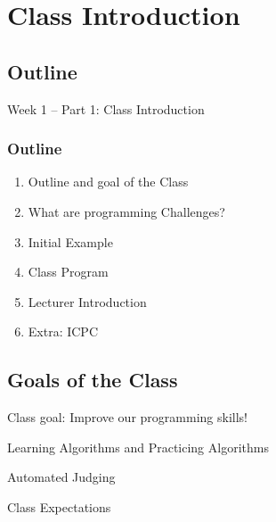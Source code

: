 
\section{Class Introduction}
\subsection{Outline}

\begin{frame}
  \centering
  {\huge
    Week 1 -- Part 1: Class Introduction
  }
\end{frame}

\begin{frame}
  \frametitle{Outline}
  \begin{enumerate}
    \item Outline and goal of the Class
    \item What are programming Challenges?
    \item Initial Example
    \item Class Program
    \item Lecturer Introduction
    \item Extra: ICPC
  \end{enumerate}
\end{frame}

\subsection{Goals of the Class}
\begin{frame}{Class goal: Improve our programming skills!}
\end{frame}

\begin{frame}{Learning Algorithms and Practicing Algorithms}
\end{frame}

\begin{frame}{Automated Judging}
\end{frame}

\begin{frame}{Class Expectations}
\end{frame}

